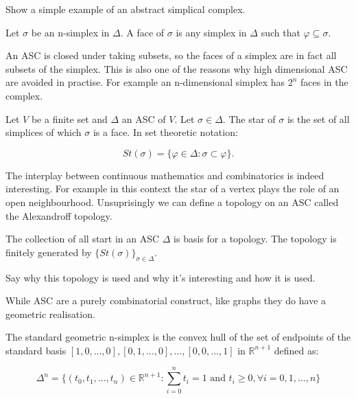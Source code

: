 \begin{ex} Show a simple example of an abstract simplical complex. \end{ex}


\begin{defn} Let $\sigma$ be an n-simplex in $\Delta$. A face of $\sigma$ is any simplex in $\Delta$ such that $\varphi \subseteq \sigma$. \end{defn}

An ASC is closed under taking subsets, so the faces of a simplex are in fact all subsets of the simplex. This is also one of the reasons why high dimensional ASC are avoided in practise. For example an n-dimensional simplex has $2^n$ faces in the complex.

\begin{defn} Let $V$ be a finite set and $\Delta$ an ASC of $V$. Let $\sigma \in \Delta$. The star of $\sigma$ is the set of all simplices of which $\sigma$ is a face. In set theoretic notation:\end{defn}

$$ St(\sigma) =  \{ \varphi \in \Delta : \sigma \subset \varphi \}. $$

The interplay between continuous mathematics and combinatorics is indeed interesting. For example in this context the star of a vertex plays the role of an open neighbourhood. Unsuprisingly we can define a topology on an ASC called the Alexandroff topology.


\begin{defn} The collection of all start in an ASC $\Delta$ is basis for a topology. The topology is finitely generated by $\{St(\sigma)\}_{\sigma \in \Delta}$.  \end{defn}

Say why this topology is used and why it's interesting and how it is used.

While ASC are a purely combinatorial construct, like graphs they do have a geometric realisation.

\begin{defn} The standard geometric n-simplex is the convex hull of the set of endpoints of the standard basis $[1, 0, ..., 0], [0, 1, ..., 0], ..., [0, 0, ..., 1]$ in $\mathbb{R}^{n+1}$ defined as: \end{defn}


$$ \Delta^n = \{(t_0, t_1, ..., t_n) \in \mathbb{R}^{n+1} : \sum_{i = 0}^{n} t_i  = 1 \text{ and } t_i \ge 0, \forall i = 0, 1, ..., n \} $$

